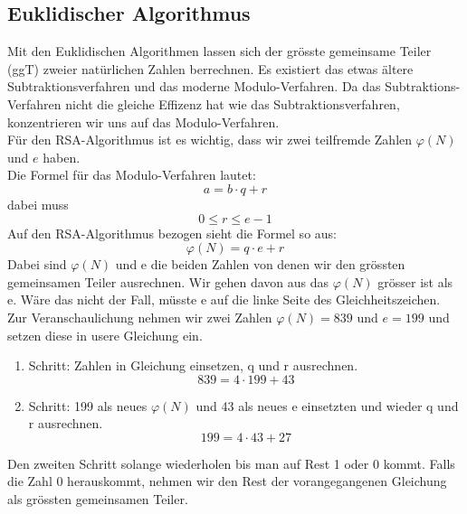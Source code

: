 \subsection{Euklidischer Algorithmus}\label{euklidischer_Algorithmus}
Mit den Euklidischen Algorithmen lassen sich der grösste gemeinsame Teiler (ggT) zweier natürlichen Zahlen berrechnen. Es existiert das etwas ältere Subtraktionsverfahren und das moderne Modulo-Verfahren. Da das Subtraktions-Verfahren nicht die gleiche Effizenz hat wie das Subtraktionsverfahren, konzentrieren wir uns auf das Modulo-Verfahren. \cite{zahlentheorie_fuer_einsteiger}\\
Für den RSA-Algorithmus ist es wichtig, dass wir zwei teilfremde Zahlen $\varphi(N)$ und $e$ haben.\\
%
Die Formel für das Modulo-Verfahren lautet:
%
\begin{equation}
  \label{eqn:euklidischer_algo}
  a = b \cdot q + r 
\end{equation}
%
dabei muss 
\begin{equation*}
  0 \leq r \leq e - 1
\end{equation*}
%
Auf den RSA-Algorithmus bezogen sieht die Formel so aus:
\begin{equation}
  \label{eqn:euklidischer_algo_RSA}
  \varphi(N) = q \cdot e + r 
\end{equation}
%
Dabei sind $\varphi(N)$ und e die beiden Zahlen von denen wir den grössten gemeinsamen Teiler ausrechnen.
Wir gehen davon aus das $\varphi(N)$ grösser ist als e. Wäre das nicht der Fall, müsste e auf die linke Seite des Gleichheitszeichen.
Zur Veranschaulichung nehmen wir zwei Zahlen $\varphi(N) = 839$ und $e = 199$ und setzen diese in usere Gleichung ein.
\begin{enumerate}
  \item Schritt: Zahlen in Gleichung einsetzen, q und r ausrechnen.\\
    \begin{equation}
      839 = 4 \cdot 199 + 43
    \end{equation}
  \item Schritt: 199 als neues $\varphi(N)$ und 43 als neues e einsetzten und wieder q und r ausrechnen.\\
    \begin{equation}
      199 = 4 \cdot 43 + 27
    \end{equation}
\end{enumerate}
Den zweiten Schritt solange wiederholen bis man auf Rest 1 oder 0 kommt. Falls die Zahl 0 herauskommt, nehmen wir den Rest der vorangegangenen Gleichung als grössten gemeinsamen Teiler.\\
